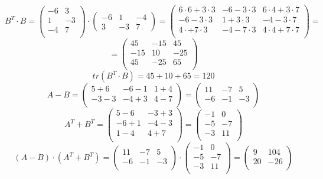 \documentclass[a4paper,12pt]{article}
\begin{document}
\[
B ^ T \cdot B = 
\begin{pmatrix}
-6 & 3\\
1 & -3\\
-4 & 7\\
\end{pmatrix}
\cdot 
\begin{pmatrix}
-6 & 1 & -4\\
3  & -3 & 7
\end{pmatrix}
=
\begin{pmatrix}
6 \cdot 6 + 3\cdot 3 & -6 - 3\cdot 3& 6 \cdot 4 + 3\cdot 7\\
-6 - 3\cdot 3 & 1 + 3\cdot 3 & -4 - 3 \cdot 7\\
4 \cdot  + 7 \cdot 3 & -4 - 7 \cdot 3 & 4 \cdot 4 + 7 \cdot 7\\
\end{pmatrix} = 
\]
\[=
\begin{pmatrix}
45 & -15 & 45\\
-15 & 10 & -25\\
45 & -25 & 65\\
\end{pmatrix}
\]
\[
tr(B^T \cdot B) = 45 + 10 + 65 = 120
\]
\[
A - B = 
\begin{pmatrix}
5 + 6 & -6 -1 & 1 + 4\\
-3 -3 & -4 + 3 & 4 - 7\\
\end{pmatrix}
=
\begin{pmatrix}
11 & -7 & 5\\
-6 & -1 & -3\\
\end{pmatrix}
\]
\[
A^T + B^T = 
\begin{pmatrix}
5 - 6 & -3 + 3\\
-6 + 1 & -4 - 3\\
1  -4 & 4 + 7\\
\end{pmatrix} = 
\begin{pmatrix}
-1 & 0\\
-5 & -7\\
-3 & 11\\
\end{pmatrix}
\]
\[
(A -B) \cdot (A^T + B^T) = \begin{pmatrix}
11 & -7 & 5\\
-6 & -1 & -3\\
\end{pmatrix} \cdot
\begin{pmatrix}
-1 & 0\\-5 & -7 \\ -3 & 11\\
\end{pmatrix} = 
\begin{pmatrix}
9 & 104\\20 & -26\\
\end{pmatrix}
\] 
\end{document}
